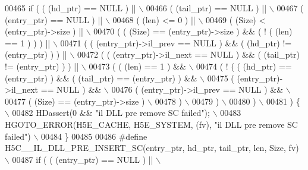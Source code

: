 \begin{DoxyCode}
00465 \textcolor{preprocessor}{if ( ( (hd\_ptr) == NULL ) ||                                                  \(\backslash\)}
00466 \textcolor{preprocessor}{     ( (tail\_ptr) == NULL ) ||                                                \(\backslash\)}
00467 \textcolor{preprocessor}{     ( (entry\_ptr) == NULL ) ||                                               \(\backslash\)}
00468 \textcolor{preprocessor}{     ( (len) <= 0 ) ||                                                        \(\backslash\)}
00469 \textcolor{preprocessor}{     ( (Size) < (entry\_ptr)->size ) ||                                        \(\backslash\)}
00470 \textcolor{preprocessor}{     ( ( (Size) == (entry\_ptr)->size ) && ( ! ( (len) == 1 ) ) ) ||           \(\backslash\)}
00471 \textcolor{preprocessor}{     ( ( (entry\_ptr)->il\_prev == NULL ) && ( (hd\_ptr) != (entry\_ptr) ) ) ||   \(\backslash\)}
00472 \textcolor{preprocessor}{     ( ( (entry\_ptr)->il\_next == NULL ) && ( (tail\_ptr) != (entry\_ptr) ) ) || \(\backslash\)}
00473 \textcolor{preprocessor}{     ( ( (len) == 1 ) &&                                                      \(\backslash\)}
00474 \textcolor{preprocessor}{       ( ! ( ( (hd\_ptr) == (entry\_ptr) ) && ( (tail\_ptr) == (entry\_ptr) ) &&  \(\backslash\)}
00475 \textcolor{preprocessor}{             ( (entry\_ptr)->il\_next == NULL ) &&                              \(\backslash\)}
00476 \textcolor{preprocessor}{             ( (entry\_ptr)->il\_prev == NULL ) &&                              \(\backslash\)}
00477 \textcolor{preprocessor}{             ( (Size) == (entry\_ptr)->size )                                  \(\backslash\)}
00478 \textcolor{preprocessor}{           )                                                                  \(\backslash\)}
00479 \textcolor{preprocessor}{       )                                                                      \(\backslash\)}
00480 \textcolor{preprocessor}{     )                                                                        \(\backslash\)}
00481 \textcolor{preprocessor}{   ) \{                                                                        \(\backslash\)}
00482 \textcolor{preprocessor}{    HDassert(0 && "il DLL pre remove SC failed");                             \(\backslash\)}
00483 \textcolor{preprocessor}{    HGOTO\_ERROR(H5E\_CACHE, H5E\_SYSTEM, (fv), "il DLL pre remove SC failed")   \(\backslash\)}
00484 \textcolor{preprocessor}{\}}
00485 
00486 \textcolor{preprocessor}{#define H5C\_\_IL\_DLL\_PRE\_INSERT\_SC(entry\_ptr, hd\_ptr, tail\_ptr, len, Size, fv) \(\backslash\)}
00487 \textcolor{preprocessor}{if ( ( (entry\_ptr) == NULL ) ||                                               \(\backslash\)}

\end{DoxyCode}
